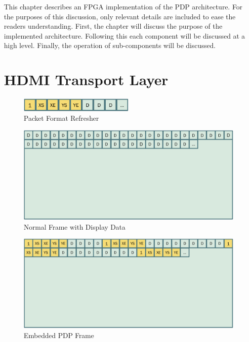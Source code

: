 \label{chap:implementation}
This chapter describes an FPGA implementation of the PDP architecture. For the purposes of this discussion, only relevant details are included to ease the readers understanding. First, the chapter will discuss the purpose of the implemented architecture. Following this each component will be discussed at a high level. Finally, the operation of sub-components will be discussed.
\section{HDMI Transport Layer}
    \label{sec:hdmi_transport_layer}
    \begin{figure}
        \centering
        \includegraphics[width=0.5\textwidth]{fig/packet_refresher.pdf}
        \caption{Packet Format Refresher}
        \label{fig:packet_refresher}
    \end{figure}
    \begin{figure}
        \centering
        \includegraphics[width=1.0\textwidth]{fig/classic_video.pdf}
        \caption{Normal Frame with Display Data}
        \label{fig:classic_video}
    \end{figure}
    \begin{figure}
        \centering
        \includegraphics[width=1.0\textwidth]{fig/embedded_frame.pdf}
        \caption{Embedded PDP Frame}
        \label{fig:embedded_frame}
    \end{figure}
